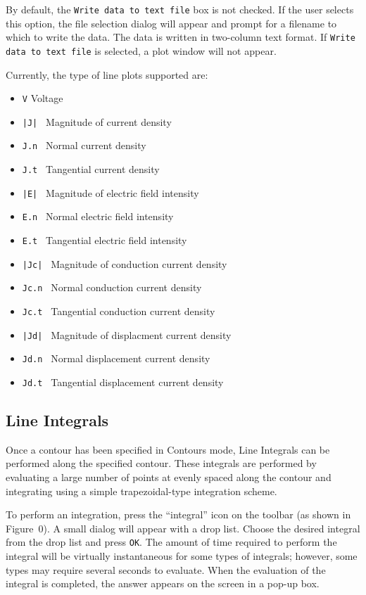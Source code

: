 By default, the \texttt{Write data to text file} box is not
checked. If the user selects this option, the file selection dialog
will appear and prompt for a filename to which to write the data.
The data is written in two-column text format. If \texttt{Write
data to text file} is selected, a plot window will not appear.

Currently, the type of line plots supported are: 
\begin{itemize}
    \item {\tt V}      Voltage
	\item {\tt |J|   } Magnitude of current density
	\item {\tt J.n } Normal current density
	\item {\tt J.t } Tangential current density
	\item {\tt |E|   } Magnitude of electric field intensity
	\item {\tt E.n } Normal electric field intensity
	\item {\tt E.t } Tangential electric field intensity
	\item {\tt |Jc|   } Magnitude of conduction current density
	\item {\tt Jc.n } Normal conduction current density
	\item {\tt Jc.t } Tangential conduction current density
	\item {\tt |Jd|   } Magnitude of displacment current density
	\item {\tt Jd.n } Normal displacement current density
	\item {\tt Jd.t } Tangential displacement current density
\end{itemize}
\subsection{Line Integrals}

Once a contour has been specified in Contours mode, Line Integrals can be
performed along the specified contour. These integrals are performed by
evaluating a large number of points at evenly spaced along the contour and
integrating using a simple trapezoidal-type integration scheme.

To perform an integration, press the ``integral'' icon on the
toolbar (as shown in Figure~0). A small dialog will appear with a
drop list. Choose the desired integral from the drop list and press
\texttt{OK}. The amount of time required to perform the integral
will be virtually instantaneous for some types of integrals;
however, some types may require several seconds to evaluate. When
the evaluation of the integral is completed, the answer appears on
the screen in a pop-up box.

